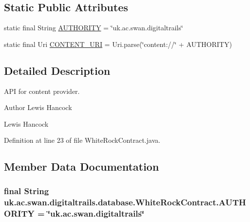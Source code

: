 \subsection*{Static Public Attributes}
\begin{DoxyCompactItemize}
\item 
static final String \hyperlink{classuk_1_1ac_1_1swan_1_1digitaltrails_1_1database_1_1_white_rock_contract_a94bf16e0a89f76da95bb2ffe76bafeea}{A\+U\+T\+H\+O\+R\+I\+T\+Y} = \char`\"{}uk.\+ac.\+swan.\+digitaltrails\char`\"{}
\item 
static final Uri \hyperlink{classuk_1_1ac_1_1swan_1_1digitaltrails_1_1database_1_1_white_rock_contract_abfe96759bfe16773a98099536eef2306}{C\+O\+N\+T\+E\+N\+T\+\_\+\+U\+R\+I} = Uri.\+parse(\char`\"{}content\+://\char`\"{} + A\+U\+T\+H\+O\+R\+I\+T\+Y)
\end{DoxyCompactItemize}


\subsection{Detailed Description}
A\+P\+I for content provider. 

\begin{DoxyAuthor}{Author}
Lewis Hancock 

Lewis Hancock 
\end{DoxyAuthor}


Definition at line 23 of file White\+Rock\+Contract.\+java.



\subsection{Member Data Documentation}
\hypertarget{classuk_1_1ac_1_1swan_1_1digitaltrails_1_1database_1_1_white_rock_contract_a94bf16e0a89f76da95bb2ffe76bafeea}{
\subsubsection[{A\+U\+T\+H\+O\+R\+I\+T\+Y}]{\setlength{\rightskip}{0pt plus 5cm}final String uk.\+ac.\+swan.\+digitaltrails.\+database.\+White\+Rock\+Contract.\+A\+U\+T\+H\+O\+R\+I\+T\+Y = \char`\"{}uk.\+ac.\+swan.\+digitaltrails\char`\"{}\hspace{0.3cm}{\ttfamily [static]}}}\label{classuk_1_1ac_1_1swan_1_1digitaltrails_1_1database_1_1_white_rock_contract_a94bf16e0a89f76da95bb2ffe76bafeea}


